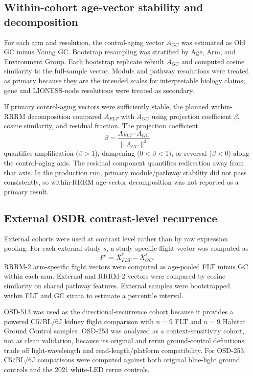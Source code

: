 \documentclass[11pt]{article}
\begin{document}
\subsection{Within-cohort age-vector stability and decomposition}

For each arm and resolution, the control-aging vector $A_{GC}$ was estimated as Old GC minus Young GC. Bootstrap resampling was stratified by Age, Arm, and Environment Group. Each bootstrap replicate rebuilt $A_{GC}$ and computed cosine similarity to the full-sample vector. Module and pathway resolutions were treated as primary because they are the intended scales for interpretable biology claims; gene and LIONESS-node resolutions were treated as secondary.

If primary control-aging vectors were sufficiently stable, the planned within-RRRM decomposition compared $A_{FLT}$ with $A_{GC}$ using projection coefficient $\beta$, cosine similarity, and residual fraction. The projection coefficient
\begin{equation}
\beta = \frac{A_{FLT}\cdot A_{GC}}{\lVert A_{GC}\rVert^2}
\end{equation}
quantifies amplification ($\beta>1$), dampening ($0<\beta<1$), or reversal ($\beta<0$) along the control-aging axis. The residual component quantifies redirection away from that axis. In the production run, primary module/pathway stability did not pass consistently, so within-RRRM age-vector decomposition was not reported as a primary result.

\subsection{External OSDR contrast-level recurrence}

External cohorts were used at contrast level rather than by raw expression pooling. For each external study $s$, a study-specific flight vector was computed as
\begin{equation}
F^{s} = \bar{X}^{s}_{FLT} - \bar{X}^{s}_{GC}.
\end{equation}
RRRM-2 arm-specific flight vectors were computed as age-pooled FLT minus GC within each arm. External and RRRM-2 vectors were compared by cosine similarity on shared pathway features. External samples were bootstrapped within FLT and GC strata to estimate a percentile interval.

OSD-513 was used as the directional-recurrence cohort because it provides a powered C57BL/6J kidney flight comparison with $n=9$ FLT and $n=9$ Habitat Ground Control samples. OSD-253 was analyzed as a context-sensitivity cohort, not as clean validation, because its original and rerun ground-control definitions trade off light-wavelength and read-length/platform compatibility. For OSD-253, C57BL/6J comparisons were computed against both original blue-light ground controls and the 2021 white-LED rerun controls.
\end{document}
